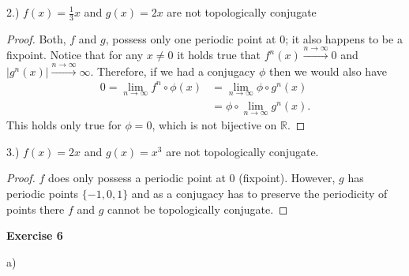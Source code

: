 \documentclass{article}
\newcommand{\R}{\mathbb{R}}
\theoremstyle{definition}
\theoremstyle{plain}
\theoremstyle{remark}
\newcommand{\aufgabe}[1]{
	{
		\vspace*{0.5cm}
		\textsf{\textbf{Exercise #1}}
		\vspace*{0.2cm}

	}
}
\newcommand{\teilaufgabe}[1]{
	{
\noindent 
\vspace*{0.2cm}
\hspace*{0,1 cm}
\textsf{#1)}
}
}
\begin{document}
\teilaufgabe{2.} $f(x)=\frac{1}{3}x$ and $g(x)= 2x$ are not topologically conjugate
\begin{proof}
	Both, $f$ and $g$, possess only one periodic point at $0$; it also happens to be a fixpoint. Notice that for any $x \neq 0$ it holds true that $f^n(x) \overset{n\rightarrow\infty}{\longrightarrow} 0$ and $|g^n(x)| \overset{n\rightarrow\infty}{\longrightarrow} \infty$. Therefore, if we had a conjugacy $\phi$ then we would also have
	\begin{align}
		0 = \lim_{n\to\infty} f^n\circ \phi (x) &= \lim_{n\to \infty} \phi\circ g^n(x)  \\
							&=\phi\circ\lim_{n\to\infty}g^n (x).
	\end{align}
This holds only true for $\phi = 0$, which is not bijective on $\R$.
\end{proof}
\teilaufgabe{3.} $f(x)=2x$ and $g(x)=x^3$ are not topologically conjugate.
\begin{proof}
	$f$ does only possess a periodic point at $0$ (fixpoint). However, $g$ has periodic points $\{-1 ,0 , 1\}$ and as a conjugacy has to preserve the periodicity of points there $f$ and $g$ cannot be topologically conjugate. 
\end{proof}
\aufgabe6
\teilaufgabe{a}
\end{document}
